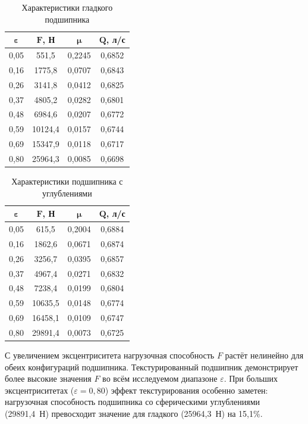\begin{table}[H]
\small
\centering
\caption{Характеристики гладкого подшипника}
\label{tab:smooth_results}
\begin{tabular}{|c|c|c|c|}
\hline
$\boldsymbol{\varepsilon}$ & $\boldsymbol{F}$\textbf{, Н} & $\boldsymbol{\mu}$ & $\boldsymbol{Q}$\textbf{, л/с} \\
\hline
0{,}05 & 551{,}5 & 0{,}2245 & 0{,}6852 \\
\hline
0{,}16 & 1775{,}8 & 0{,}0707 & 0{,}6843 \\
\hline
0{,}26 & 3141{,}8 & 0{,}0412 & 0{,}6825 \\
\hline
0{,}37 & 4805{,}2 & 0{,}0282 & 0{,}6801 \\
\hline
0{,}48 & 6984{,}6 & 0{,}0207 & 0{,}6772 \\
\hline
0{,}59 & 10124{,}4 & 0{,}0157 & 0{,}6744 \\
\hline
0{,}69 & 15347{,}9 & 0{,}0118 & 0{,}6717 \\
\hline
0{,}80 & 25964{,}3 & 0{,}0085 & 0{,}6698 \\
\hline
\end{tabular}
\end{table}

\begin{table}[H]
\small
\centering
\caption{Характеристики подшипника с \varDimpleTypeGenitive{} углублениями}
\label{tab:textured_results}
\begin{tabular}{|c|c|c|c|}
\hline
$\boldsymbol{\varepsilon}$ & $\boldsymbol{F}$\textbf{, Н} & $\boldsymbol{\mu}$ & $\boldsymbol{Q}$\textbf{, л/с} \\
\hline
0{,}05 & 615{,}5 & 0{,}2004 & 0{,}6884 \\
\hline
0{,}16 & 1862{,}6 & 0{,}0671 & 0{,}6874 \\
\hline
0{,}26 & 3256{,}7 & 0{,}0395 & 0{,}6857 \\
\hline
0{,}37 & 4967{,}4 & 0{,}0271 & 0{,}6832 \\
\hline
0{,}48 & 7238{,}4 & 0{,}0199 & 0{,}6804 \\
\hline
0{,}59 & 10635{,}5 & 0{,}0148 & 0{,}6774 \\
\hline
0{,}69 & 16458{,}1 & 0{,}0109 & 0{,}6747 \\
\hline
0{,}80 & 29891{,}4 & 0{,}0073 & 0{,}6725 \\
\hline
\end{tabular}
\end{table}

С увеличением эксцентриситета нагрузочная способность $F$ растёт нелинейно для обеих конфигураций подшипника. Текстурированный подшипник демонстрирует более высокие значения $F$ во всём исследуемом диапазоне $\varepsilon$. При больших эксцентриситетах ($\varepsilon = 0{,}80$) эффект текстурирования особенно заметен: нагрузочная способность подшипника со сферическими углублениями (29891{,}4~Н) превосходит значение для гладкого (25964{,}3~Н) на 15{,}1\%.

